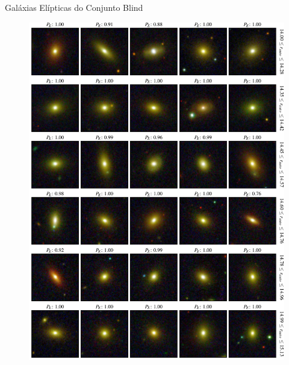 \documentclass[10pt,xcolor=svgnames]{beamer}
\begin{document}
\begin{frame}{Galáxias Elípticas do Conjunto Blind}
  \begin{minipage}{0.49\textwidth}
    \begin{figure}
      \includegraphics[width=\linewidth]{figures/blind_preds_ellip_1.pdf}
    \end{figure}
  \end{minipage}\hfill
  \begin{minipage}{0.49\textwidth}
    \begin{figure}

\end{figure}
\end{minipage}
\end{frame}
\end{document}
